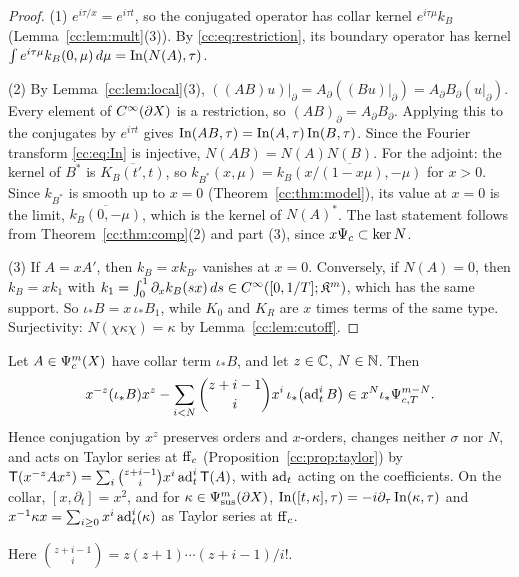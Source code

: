 \begin{proof}
(1) \(e^{i\tau/x}=e^{i\tau t}\), so the conjugated operator has collar
kernel \(e^{i\tau\mu}k_B\) (Lemma~\ref{cc:lem:mult}(3)). By
\eqref{cc:eq:restriction}, its boundary operator has kernel
\(\int e^{i\tau\mu}k_B(0,\mu)\,d\mu=\operatorname{In}(N(A),\tau)\).

(2) By Lemma~\ref{cc:lem:local}(3), \(((AB)u)|_\partial=A_\partial
((Bu)|_\partial)=A_\partial B_\partial(u|_\partial)\). Every element of
\(C^\infty(\partial X)\) is a restriction, so \((AB)_\partial=A_\partial
B_\partial\). Applying this to the conjugates by \(e^{i\tau t}\) gives
\(\operatorname{In}(AB,\tau)=\operatorname{In}(A,\tau)\operatorname{In}(B,\tau)\). Since the Fourier transform
\eqref{cc:eq:In} is injective, \(N(AB)=N(A)N(B)\). For the adjoint: the
kernel of \(B^*\) is \(\overline{K_B(t',t)}\), so
\(k_{B^*}(x,\mu)=\overline{k_B(x/(1-x\mu),-\mu)}\) for \(x>0\). Since
\(k_{B^*}\) is smooth up to \(x=0\) (Theorem~\ref{cc:thm:model}), its value
at \(x=0\) is the limit, \(\overline{k_B(0,-\mu)}\), which is the kernel
of \(N(A)^*\). The last statement follows from
Theorem~\ref{cc:thm:comp}(2) and part (3), since \(x\Psi_{c}\subset\ker N\).

(3) If \(A=xA'\), then \(k_B=xk_{B'}\) vanishes at \(x=0\). Conversely,
if \(N(A)=0\), then \(k_B=xk_1\) with \(k_1=\int_0^1\partial_xk_B(sx)\,ds
\in C^\infty([0,1/T];\mathfrak K^m)\), which has the same support. So
\(\iota_*B=x\,\iota_*B_1\), while \(K_0\) and \(K_R\) are \(x\) times terms
of the same type. Surjectivity: \(N(\chi\kappa\chi)=\kappa\) by
Lemma~\ref{cc:lem:cutoff}.
\end{proof}

\begin{proposition}\label{cc:prop:conj}
Let \(A\in\Psi_{c}^m(X)\) have collar term \(\iota_*B\), and let \(z\in\mathbb C\),
\(N\in\mathbb N\). Then
\[
 x^{-z}(\iota_*B)x^z-\sum_{i<N}\binom{z+i-1}{i}x^i\,\iota_*\bigl(\operatorname{ad}_t^i
 B\bigr)\in x^N\iota_*\Psi_{c,T}^{m-N} .
\]
Hence conjugation by \(x^z\) preserves orders and \(x\)-orders, changes
neither \(\sigma\) nor \(N\), and acts on Taylor series at \(\mathrm{ff}_c\)
(Proposition~\ref{cc:prop:taylor}) by
\(\mathsf T(x^{-z}Ax^z)=\sum_i\binom{z+i-1}{i}x^i\operatorname{ad}_t^i\mathsf T(A)\),
with \(\operatorname{ad}_t\) acting on the coefficients. On the collar,
\([x,\partial_t]=x^2\), and for \(\kappa\in\Psi_{\mathrm{sus}}^m(\partial X)\),
\(\operatorname{In}([t,\kappa],\tau)=-i\partial_\tau\operatorname{In}(\kappa,\tau)\) and
\(x^{-1}\kappa x=\sum_{i\ge0}x^i\operatorname{ad}_t^i(\kappa)\) as Taylor series at
\(\mathrm{ff}_c\).
\end{proposition}

Here \(\binom{z+i-1}{i}=z(z+1)\cdots(z+i-1)/i!\).

